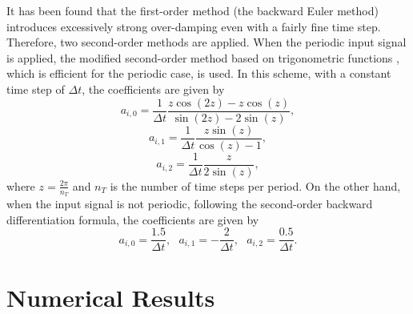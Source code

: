 \documentclass[journal]{IEEEtran}
\begin{document}
   It has been found that the first-order method (the backward Euler method) introduces excessively strong over-damping even with a fairly fine time step. 
   Therefore, two second-order methods are applied.
   When the periodic input signal is applied, 
the modified second-order method based on trigonometric functions \cite{Brachtendorf2013,Jungemann2017}, which is efficient for the periodic case, is used. 
   In this scheme, with a constant time step of $\Delta t$, the coefficients are given by
\begin{equation}
a_{i,0 } = \frac{1}{\Delta t} \frac{z\cos(2z) - z\cos(z)}{\sin(2z)-2\sin(z)},
\end{equation} 
\begin{equation}
a_{i,1} = \frac{1}{\Delta t} \frac{z \sin(z)}{\cos(z) - 1},
\end{equation}  
\begin{equation}
a_{i,2} = \frac{1}{\Delta t} \frac{z}{2\sin(z)},
\end{equation}    
where $z = \frac{2\pi}{n_T}$ and $n_T$ is the number of time steps per period.
   On the other hand, when the input signal is not periodic, 
following the second-order backward differentiation formula, 
the coefficients are given by
\begin{equation}
a_{i,0 } = \frac{1.5}{\Delta t},~~~ a_{i,1} = -\frac{2}{\Delta t},~~~ a_{i,2} = \frac{0.5}{\Delta t}. 
\end{equation} 
    

\section{Numerical Results}
\end{document}
